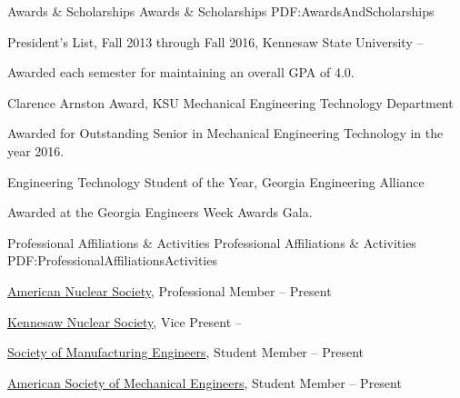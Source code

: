 \documentclass[letterpaper,MMMyyyy,nonstopmode]{resume}
\begin{document}
\begin{Body}

\Section
{Awards \&\newline
Scholarships}
{Awards \& Scholarships}
{PDF:AwardsAndScholarships}

\BulletItem
President's List,
Fall 2013 through Fall 2016,
Kennesaw State University
\hfill
{} --
\begin{Detail}
\Item
Awarded each semester for maintaining an overall GPA of 4.0.
\end{Detail}

\Gap
\BulletItem
Clarence Arnston Award,
KSU Mechanical Engineering Technology Department
\hfill
{}
\begin{Detail}
\Item
Awarded for Outstanding Senior in Mechanical Engineering Technology in the year 2016.
\end{Detail}

\Gap
\BulletItem
Engineering Technology Student of the Year,
Georgia Engineering Alliance
\hfill
{}
\begin{Detail}
\Item
Awarded at the Georgia Engineers Week Awards Gala.
\end{Detail}



\Section
{Professional Affiliations\newline
\& Activities}
{Professional Affiliations \& Activities}
{PDF:ProfessionalAffiliationsActivities}

\BulletItem
\href{http://www.ans.org/}
{American Nuclear Society},
Professional Member
\hfill
{} -- Present

\BulletItem
\href{https://owllife.kennesaw.edu/organization/KNS}
{Kennesaw Nuclear Society},
Vice Present
\hfill
{} -- 

\BulletItem
\href{http://www.sme.org/}
{Society of Manufacturing Engineers},
Student Member
\hfill
{} -- Present

\BulletItem
\href{http://www.asme.org/}
{American Society of Mechanical Engineers},
Student Member
\hfill
{} -- Present




\end{Body}
\end{document}
